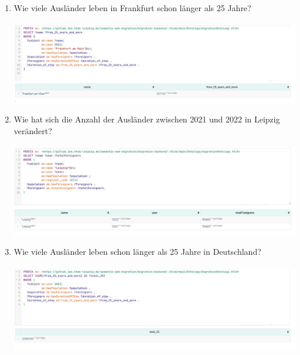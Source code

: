 \documentclass[a4paper, 12pt]{article}
\begin{document}
\begin{enumerate}
    \item Wie viele Ausländer leben in Frankfurt schon länger als 25 Jahre? \\ \\
    \includegraphics[width=1\textwidth]{Frage5.jpg} \\
    \item Wie hat sich die Anzahl der Ausländer zwischen 2021 und 2022 in Leipzig verändert? \\ \\
    \includegraphics[width=1\textwidth]{Frage6.jpg} \\
    \item Wie viele Ausländer leben schon länger als 25 Jahre in Deutschland? \\ \\
    \includegraphics[width=1\textwidth]{Frage7.jpg} \\
\end{enumerate}
\end{document}
